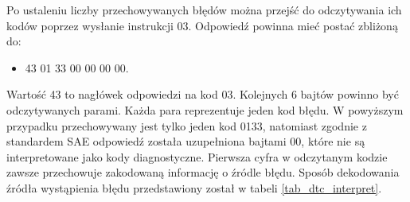\documentclass[12pt]{article} %
\numberwithin{equation}{subsection}
\numberwithin{figure}{section}
\numberwithin{table}{section}
\begin{document}
		Po ustaleniu liczby przechowywanych błędów można przejść do odczytywania ich kodów poprzez wysłanie instrukcji 03. Odpowiedź powinna mieć postać zbliżoną do:
		
		\begin{itemize}
			\item{43 01 33 00 00 00 00.}
		\end{itemize}
		
		Wartość 43 to nagłówek odpowiedzi na kod 03. Kolejnych 6 bajtów powinno być odczytywanych parami. Każda para reprezentuje jeden kod błędu. W powyższym przypadku przechowywany jest tylko jeden kod 0133, natomiast zgodnie z standardem SAE odpowiedź została uzupełniona bajtami 00, które nie są interpretowane jako kody diagnostyczne. Pierwsza cyfra w odczytanym kodzie zawsze przechowuje zakodowaną informację o źródle błędu. Sposób dekodowania źródła wystąpienia błędu przedstawiony został w tabeli \ref{tab_dtc_interpret}.
		
		\newpage
		
\end{document}
